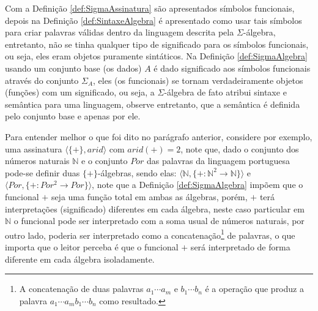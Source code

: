 Com a Definição \ref{def:SigmaAssinatura} são apresentados símbolos funcionais, depois na Definição \ref{def:SintaxeAlgebra} é apresentado como usar tais símbolos para criar palavras válidas dentro da linguagem descrita pela $\Sigma$-álgebra, entretanto, não se tinha qualquer tipo de significado para os símbolos funcionais, ou seja, eles eram objetos puramente sintáticos. Na Definição \ref{def:SigmaAlgebra} usando um conjunto base (os dados) $A$ é dado significado aos símbolos funcionais através do conjunto $\Sigma_A$, eles (os funcionais) se tornam verdadeiramente objetos (funções) com um significado, ou seja, a $\Sigma$-álgebra de fato atribui sintaxe e semântica para uma linguagem, observe entretanto, que a semântica é definida pelo conjunto base e apenas por ele. 

Para entender melhor o que foi dito no parágrafo anterior, considere por exemplo, uma assinatura $\langle \{+\}, arid \rangle$ com $arid(+)  = 2$, note que, dado o conjunto dos números naturais $\mathbb{N}$ e o conjunto $Por$ das palavras da linguagem portuguesa pode-se definir duas $\{+\}$-álgebras, sendo elas: $\langle \mathbb{N}, \{+ :\mathbb{N}^2 \rightarrow \mathbb{N}\} \rangle$ e $\langle Por, \{+ :Por^2 \rightarrow Por\} \rangle$, note que a Definição \ref{def:SigmaAlgebra} impõem que o funcional $+$ seja uma função total em ambas as álgebras, porém, $+$ terá interpretações (significado) diferentes em cada álgebra, neste caso particular em $\mathbb{N}$ o funcional pode ser interpretado com a soma usual de números naturais, por outro lado, poderia ser interpretado como a concatenação\footnote{A concatenação de duas palavras $a_1\cdots a_m$ e $b_1\cdots b_n$ é a operação que produz a palavra $a_1\cdots a_mb_1\cdots b_n$ como resultado.} de palavras, o que importa que o leitor perceba é que o funcional $+$ será interpretado de forma diferente em cada álgebra isoladamente.

